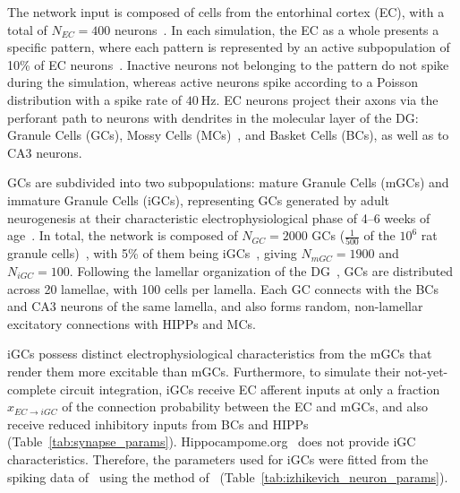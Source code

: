 


The network input is composed of cells from the entorhinal cortex (EC), with a total of $N_{EC} = 400$
neurons~\parencite{amaralChapter1990, kimAdult2024}. In each simulation, the EC as a whole presents a specific pattern, where each
pattern is represented by an active subpopulation of 10\% of EC neurons~\parencite{mcnaughtonDead1991}. Inactive neurons not
belonging to the pattern do not spike during the simulation, whereas active neurons spike according to a Poisson distribution with
a spike rate of $\SI{40}{\hertz}$. EC neurons project their axons via the perforant path to neurons with dendrites in the
molecular layer of the DG\@: Granule Cells (GCs), Mossy Cells (MCs)~\parencite{scharfmanHilar2013}, and Basket Cells (BCs), as
well as to CA3 neurons.

GCs are subdivided into two subpopulations: mature Granule Cells (mGCs) and immature Granule Cells (iGCs), representing GCs
generated by adult neurogenesis at their characteristic electrophysiological phase of 4--6 weeks of
age~\parencite{aimoneRegulation2014}. In total, the network is composed of $N_{GC} = 2000$ GCs ($\frac{1}{500}$ of the $10^6$ rat
granule cells)~\parencite{westUnbiased1991}, with 5\% of them being iGCs~\parencite{cameronAdult2001}, giving $N_{mGC} = 1900$ and
$N_{iGC} = 100$. Following the lamellar organization of the DG~\parencite{sloviterUpdating2012}, GCs are distributed across 20
lamellae, with 100 cells per lamella. Each GC connects with the BCs and CA3 neurons of the same lamella, and also forms
random, non-lamellar excitatory connections with HIPPs and MCs.


iGCs possess distinct electrophysiological characteristics from the mGCs that render them more excitable than mGCs. Furthermore,
to simulate their not-yet-complete circuit integration, iGCs receive EC afferent inputs at only a fraction $x_{EC \to iGC}$ of the
connection probability between the EC and mGCs, and also receive reduced inhibitory inputs from BCs and HIPPs
(Table~\ref{tab:synapse_params}). Hippocampome.org~\parencite{wheelerHippocampomeorg2023} does not provide iGC characteristics.
Therefore, the parameters used for iGCs were fitted from the spiking data of~\textcite{espositoNeuronal2005} using the method
of~\textcite{nelderSimplex1965} (Table~\ref{tab:izhikevich_neuron_params}).

